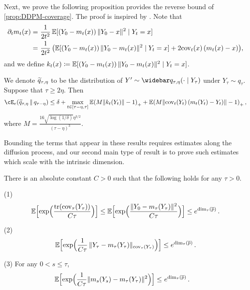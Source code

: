 Next, we prove the following proposition provides the reverse bound of \cref{prop:DDPM-coverage}. The proof is inspired by \citet{jiao2025optimal}. Note that
\begin{align*}
    \partial_t m_t(x)=&~\frac{1}{2t^2} \En[ (Y_0-m_t(x))\,\nrm{Y_0-x}^2 \mid Y_t=x ] \\
    =&~\frac{1}{2t^2}\,\prn*{ \En[ (Y_0-m_t(x))\,\nrm{Y_0-m_t(x)}^2 \mid Y_t=x ]+2\cov_t(x)\,(m_t(x)-x) },
\end{align*}
and we define $k_t(x)\deq \En[ (Y_0-m_t(x))\,\nrm{Y_0-m_t(x)}^2 \mid Y_t=x ]$. 

\begin{proposition}\label{prop:coverage-backward}
We denote $\wt{q}_{\tau,\eta}$ to be the distribution of $Y'\sim \wb{q}_{\tau,\eta}(\cdot\mid Y_\tau)$ under $Y_\tau\sim q_\tau$. Suppose that $\tau\geq 2\eta$. Then
\begin{align*}
    \Dcov[e]{\wt{q}_{\tau,\eta}}{q_{\tau-\eta}}\leq \delta+\max_{t\in[\tau-\eta,\tau]}\En\prn*{M \nrm{k_t(Y_t)}-1 }_++\En\prn*{M \nrm{\cov_t(Y_t)\,(m_t(Y_t)-Y_t)}-1 }_+\,,
\end{align*}
where $M=\frac{16\sqrt{\log(1/\delta)}\eta^{3/2}}{(\tau-\eta)^{3}}$.
\end{proposition}

Bounding the terms that appear in these results requires estimates along the diffusion process, and our second main type of result is to prove such estimates which scale with the intrinsic dimension.

\begin{corollary}\label{cor:MGF-intrinsic}
There is an absolute constant $C>0$ such that the following holds for any $\tau>0$.

(1) 
\begin{align*}
    \En\brk[\Big]{ \exp\prn[\Big]{ \frac{\tr(\cov_\tau(Y_\tau))}{C\tau} }}\leq \En\brk[\Big]{ \exp\prn[\Big]{ \frac{\nrm{Y_0-m_\tau(Y_\tau)}^2}{C\tau} }}\leq e^{\dim_\tau(\pbar)}\,.
\end{align*}

(2)
\begin{align*}
    \En\brk[\Big]{ \exp\prn[\Big]{ \frac{1}{C\tau}\,\nrm{Y_\tau-m_\tau(Y_\tau)}_{\cov_\tau(Y_\tau)} }}\leq e^{\dim_\tau(\pbar)}\,.
\end{align*}

(3) For any $0<s\leq \tau$,
\begin{align*}
    \En\brk[\Big]{ \exp\prn[\Big]{ \frac{1}{C\tau}\nrm{m_s(Y_s)-m_\tau(Y_\tau)}^2 } }
    \leq&~ e^{\dim_\tau(\pbar)}\,.
\end{align*}
\end{corollary}

